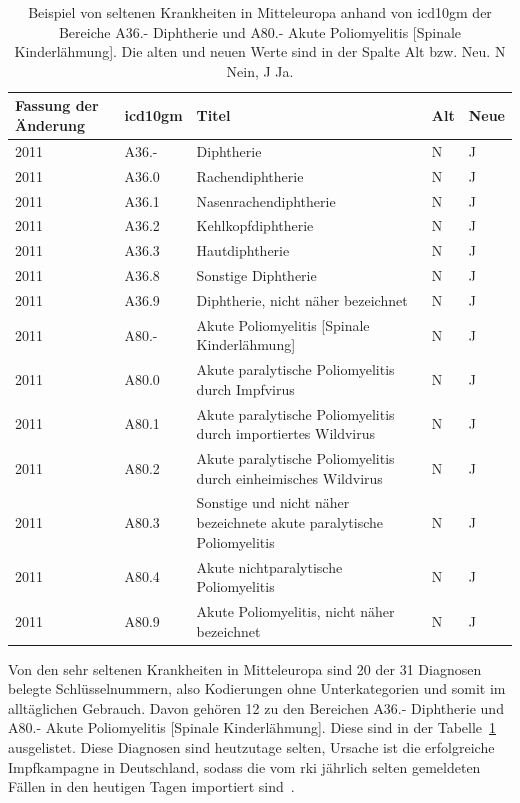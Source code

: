 \begin{table}[ht]
	\centering
	\caption[Beispiel von seltenen Krankheiten in Mitteleuropa (Diphtherie und Poliomyelitis)]{Beispiel von seltenen Krankheiten in Mitteleuropa anhand von \ac{icd10gm} der Bereiche \textsf{A36.-} \textsf{Diphtherie} und \textsf{A80.-} \textsf{Akute Poliomyelitis [Spinale Kinderlähmung]}. Die alten und neuen Werte sind in der Spalte \glqq Alt\grqq{} bzw. \glqq Neu\grqq{}. \glqq\textsf{N}\grqq{} Nein, \glqq\textsf{J}\grqq{}\grqq{} Ja.}
	\label{tab:icdeuropa}
	\begin{tabular}{|p{1.6cm}|l|p{7cm}|l|l|}
		\hline
		\rowcolor{lightgray} Fassung der Änderung & \ac{icd10gm} & Titel & Alt & Neue \\ \hline
		\rowcolor{maroon!10} 2011 & A36.- & Diphtherie & N & J \\ \hline
		2011 & A36.0 & Rachendiphtherie & N & J \\ \hline
		2011 & A36.1 & Nasenrachendiphtherie & N & J \\ \hline
		2011 & A36.2 & Kehlkopfdiphtherie & N & J \\ \hline
		2011 & A36.3 & Hautdiphtherie & N & J \\ \hline
		2011 & A36.8 & Sonstige Diphtherie & N & J \\ \hline
		2011 & A36.9 & Diphtherie, nicht näher bezeichnet & N & J \\ \hline \hline
		\rowcolor{maroon!10} 2011 & A80.- & Akute Poliomyelitis [Spinale Kinderlähmung] & N & J \\ \hline
		2011 & A80.0 & Akute paralytische Poliomyelitis durch Impfvirus & N & J \\ \hline
		2011 & A80.1 & Akute paralytische Poliomyelitis durch importiertes Wildvirus & N & J \\ \hline
		2011 & A80.2 & Akute paralytische Poliomyelitis durch einheimisches Wildvirus & N & J \\ \hline
		2011 & A80.3 & Sonstige und nicht näher bezeichnete akute paralytische Poliomyelitis & N & J \\ \hline
		2011 & A80.4 & Akute nichtparalytische Poliomyelitis & N & J \\ \hline
		2011 & A80.9 & Akute Poliomyelitis, nicht näher bezeichnet & N & J \\ \hline
	\end{tabular}
\end{table}

Von den sehr seltenen Krankheiten in Mitteleuropa sind 20 der 31 Diagnosen belegte Schlüsselnummern, also Kodierungen ohne Unterkategorien und somit im alltäglichen  Gebrauch. Davon gehören 12 zu den Bereichen \textsf{A36.-} \textsf{Diphtherie} und \textsf{A80.-} \textsf{Akute Poliomyelitis [Spinale Kinderlähmung]}. Diese sind in der Tabelle~\ref{tab:icdeuropa} ausgelistet. Diese Diagnosen sind heutzutage selten, Ursache ist die erfolgreiche Impfkampagne in Deutschland, sodass die vom \ac{rki} jährlich selten gemeldeten Fällen in den heutigen Tagen importiert sind~\cite{dippol1}.

